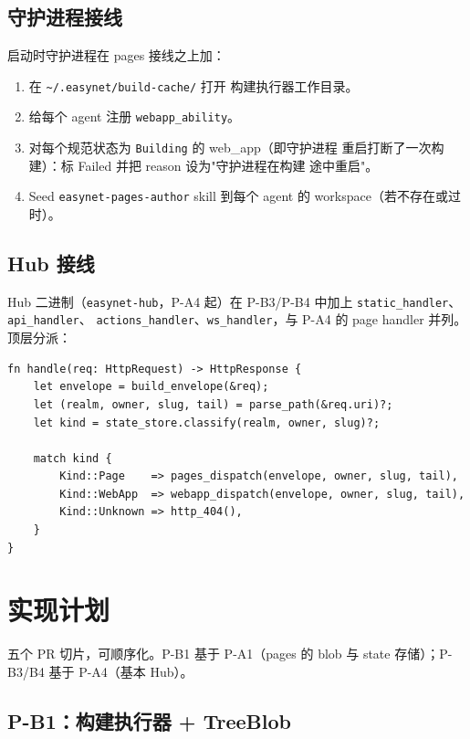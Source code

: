 \documentclass[11pt,a4paper]{article}
\theoremstyle{definition}
\begin{document}
\subsection{守护进程接线}

启动时守护进程在 pages 接线之上加：

\begin{enumerate}[leftmargin=2em,itemsep=0.15em]
    \item 在 \texttt{\textasciitilde/.easynet/build-cache/} 打开
    构建执行器工作目录。
    \item 给每个 agent 注册 \texttt{webapp\_ability}。
    \item 对每个规范状态为 \texttt{Building} 的 web\_app（即守护进程
    重启打断了一次构建）：标 Failed 并把 reason 设为"守护进程在构建
    途中重启"。
    \item Seed \texttt{easynet-pages-author} skill 到每个 agent 的
    workspace（若不存在或过时）。
\end{enumerate}

\subsection{Hub 接线}

Hub 二进制（\texttt{easynet-hub}，P-A4 起）在 P-B3/P-B4 中加上
\texttt{static\_handler}、\texttt{api\_handler}、
\texttt{actions\_handler}、\texttt{ws\_handler}，与 P-A4 的 page
handler 并列。顶层分派：

\begin{lstlisting}
fn handle(req: HttpRequest) -> HttpResponse {
    let envelope = build_envelope(&req);
    let (realm, owner, slug, tail) = parse_path(&req.uri)?;
    let kind = state_store.classify(realm, owner, slug)?;

    match kind {
        Kind::Page    => pages_dispatch(envelope, owner, slug, tail),
        Kind::WebApp  => webapp_dispatch(envelope, owner, slug, tail),
        Kind::Unknown => http_404(),
    }
}
\end{lstlisting}

\section{实现计划}
\label{sec:impl-plan}

五个 PR 切片，可顺序化。P-B1 基于 P-A1（pages 的 blob 与 state
存储）；P-B3/B4 基于 P-A4（基本 Hub）。

\subsection{P-B1：构建执行器 + TreeBlob}
\end{document}
